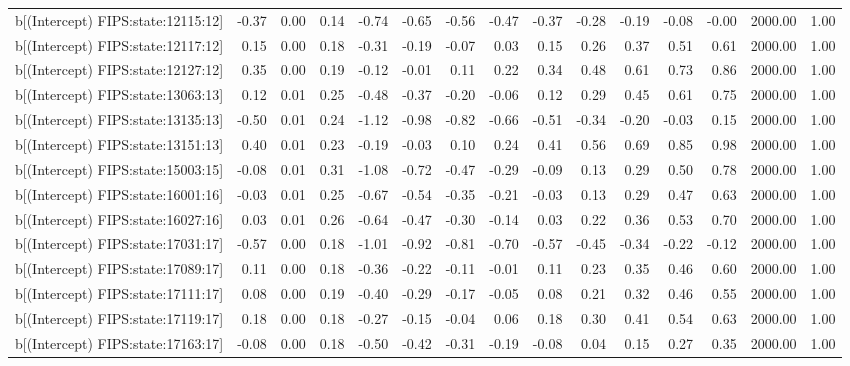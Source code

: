 \begin{table}[ht]
\begin{tabular}{rrrrrrrrrrrrrrr}
  b[(Intercept) FIPS:state:12115:12] & -0.37 & 0.00 & 0.14 & -0.74 & -0.65 & -0.56 & -0.47 & -0.37 & -0.28 & -0.19 & -0.08 & -0.00 & 2000.00 & 1.00 \\ 
  b[(Intercept) FIPS:state:12117:12] & 0.15 & 0.00 & 0.18 & -0.31 & -0.19 & -0.07 & 0.03 & 0.15 & 0.26 & 0.37 & 0.51 & 0.61 & 2000.00 & 1.00 \\ 
  b[(Intercept) FIPS:state:12127:12] & 0.35 & 0.00 & 0.19 & -0.12 & -0.01 & 0.11 & 0.22 & 0.34 & 0.48 & 0.61 & 0.73 & 0.86 & 2000.00 & 1.00 \\ 
  b[(Intercept) FIPS:state:13063:13] & 0.12 & 0.01 & 0.25 & -0.48 & -0.37 & -0.20 & -0.06 & 0.12 & 0.29 & 0.45 & 0.61 & 0.75 & 2000.00 & 1.00 \\ 
  b[(Intercept) FIPS:state:13135:13] & -0.50 & 0.01 & 0.24 & -1.12 & -0.98 & -0.82 & -0.66 & -0.51 & -0.34 & -0.20 & -0.03 & 0.15 & 2000.00 & 1.00 \\ 
  b[(Intercept) FIPS:state:13151:13] & 0.40 & 0.01 & 0.23 & -0.19 & -0.03 & 0.10 & 0.24 & 0.41 & 0.56 & 0.69 & 0.85 & 0.98 & 2000.00 & 1.00 \\ 
  b[(Intercept) FIPS:state:15003:15] & -0.08 & 0.01 & 0.31 & -1.08 & -0.72 & -0.47 & -0.29 & -0.09 & 0.13 & 0.29 & 0.50 & 0.78 & 2000.00 & 1.00 \\ 
  b[(Intercept) FIPS:state:16001:16] & -0.03 & 0.01 & 0.25 & -0.67 & -0.54 & -0.35 & -0.21 & -0.03 & 0.13 & 0.29 & 0.47 & 0.63 & 2000.00 & 1.00 \\ 
  b[(Intercept) FIPS:state:16027:16] & 0.03 & 0.01 & 0.26 & -0.64 & -0.47 & -0.30 & -0.14 & 0.03 & 0.22 & 0.36 & 0.53 & 0.70 & 2000.00 & 1.00 \\ 
  b[(Intercept) FIPS:state:17031:17] & -0.57 & 0.00 & 0.18 & -1.01 & -0.92 & -0.81 & -0.70 & -0.57 & -0.45 & -0.34 & -0.22 & -0.12 & 2000.00 & 1.00 \\ 
  b[(Intercept) FIPS:state:17089:17] & 0.11 & 0.00 & 0.18 & -0.36 & -0.22 & -0.11 & -0.01 & 0.11 & 0.23 & 0.35 & 0.46 & 0.60 & 2000.00 & 1.00 \\ 
  b[(Intercept) FIPS:state:17111:17] & 0.08 & 0.00 & 0.19 & -0.40 & -0.29 & -0.17 & -0.05 & 0.08 & 0.21 & 0.32 & 0.46 & 0.55 & 2000.00 & 1.00 \\ 
  b[(Intercept) FIPS:state:17119:17] & 0.18 & 0.00 & 0.18 & -0.27 & -0.15 & -0.04 & 0.06 & 0.18 & 0.30 & 0.41 & 0.54 & 0.63 & 2000.00 & 1.00 \\ 
  b[(Intercept) FIPS:state:17163:17] & -0.08 & 0.00 & 0.18 & -0.50 & -0.42 & -0.31 & -0.19 & -0.08 & 0.04 & 0.15 & 0.27 & 0.35 & 2000.00 & 1.00 \\ 

\end{tabular}
\end{table}
